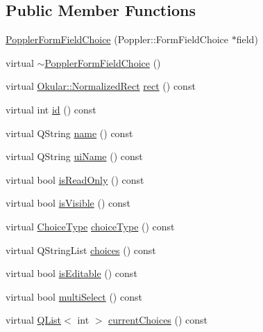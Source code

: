 \subsection*{Public Member Functions}
\begin{DoxyCompactItemize}
\item 
\hyperlink{classPopplerFormFieldChoice_a4b2843bd99f3d9fe576d73f54e715c29}{Poppler\+Form\+Field\+Choice} (Poppler\+::\+Form\+Field\+Choice $\ast$field)
\item 
virtual \hyperlink{classPopplerFormFieldChoice_a2bb9041e54dd87241b7ba535c61afa12}{$\sim$\+Poppler\+Form\+Field\+Choice} ()
\item 
virtual \hyperlink{classOkular_1_1NormalizedRect}{Okular\+::\+Normalized\+Rect} \hyperlink{classPopplerFormFieldChoice_a95b88f2ec5d489c12ad16f91eeff28ee}{rect} () const 
\item 
virtual int \hyperlink{classPopplerFormFieldChoice_a7efc9a9971d4b4af1568262225534d07}{id} () const 
\item 
virtual Q\+String \hyperlink{classPopplerFormFieldChoice_ac1eb32851e00f9a18f6f0f791e85d6ad}{name} () const 
\item 
virtual Q\+String \hyperlink{classPopplerFormFieldChoice_ae92267230146194ee31fedcf9e997f36}{ui\+Name} () const 
\item 
virtual bool \hyperlink{classPopplerFormFieldChoice_ac13b2cfa4bff848e21a577b5671016c1}{is\+Read\+Only} () const 
\item 
virtual bool \hyperlink{classPopplerFormFieldChoice_a7b297c4acd9e262a3123c62a8740d042}{is\+Visible} () const 
\item 
virtual \hyperlink{classOkular_1_1FormFieldChoice_a40b3939793e805c34303dff8262a17b3}{Choice\+Type} \hyperlink{classPopplerFormFieldChoice_a0885d5bfc0c0b51e3f24611e91edb6c3}{choice\+Type} () const 
\item 
virtual Q\+String\+List \hyperlink{classPopplerFormFieldChoice_a4c60f6daf758d95acf0f74cd67591a86}{choices} () const 
\item 
virtual bool \hyperlink{classPopplerFormFieldChoice_a88344e6f0654cb96738eae0224145345}{is\+Editable} () const 
\item 
virtual bool \hyperlink{classPopplerFormFieldChoice_a4bdcb7f2b39bcb675c786e556d4169cc}{multi\+Select} () const 
\item 
virtual \hyperlink{classQList}{Q\+List}$<$ int $>$ \hyperlink{classPopplerFormFieldChoice_a2705b4873fa80b235717260dc96dc08a}{current\+Choices} () const 
\item 

\end{DoxyCompactItemize}
